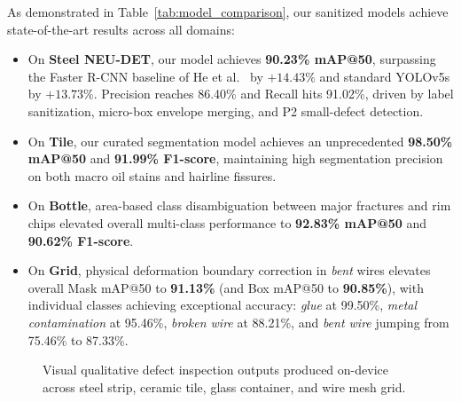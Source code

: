 \documentclass[conference]{IEEEtran}
\begin{document}
As demonstrated in Table~\ref{tab:model_comparison}, our sanitized models achieve state-of-the-art results across all domains:
\begin{itemize}
    \item On \textbf{Steel NEU-DET}, our model achieves \textbf{90.23\% mAP@50}, surpassing the Faster R-CNN baseline of He et al.~\cite{he2020steel} by $+14.43\%$ and standard YOLOv5s by $+13.73\%$. Precision reaches 86.40\% and Recall hits 91.02\%, driven by label sanitization, micro-box envelope merging, and P2 small-defect detection.
    \item On \textbf{Tile}, our curated segmentation model achieves an unprecedented \textbf{98.50\% mAP@50} and \textbf{91.99\% F1-score}, maintaining high segmentation precision on both macro oil stains and hairline fissures.
    \item On \textbf{Bottle}, area-based class disambiguation between major fractures and rim chips elevated overall multi-class performance to \textbf{92.83\% mAP@50} and \textbf{90.62\% F1-score}.
    \item On \textbf{Grid}, physical deformation boundary correction in \textit{bent} wires elevates overall Mask mAP@50 to \textbf{91.13\%} (and Box mAP@50 to \textbf{90.85\%}), with individual classes achieving exceptional accuracy: \textit{glue} at 99.50\%, \textit{metal contamination} at 95.46\%, \textit{broken wire} at 88.21\%, and \textit{bent wire} jumping from 75.46\% to 87.33\%.
\end{itemize}

\begin{figure}[h]
\centering
{}
\caption{Visual qualitative defect inspection outputs produced on-device across steel strip, ceramic tile, glass container, and wire mesh grid.}
\label{fig:qualitative_collage}
\end{figure}
\end{document}
